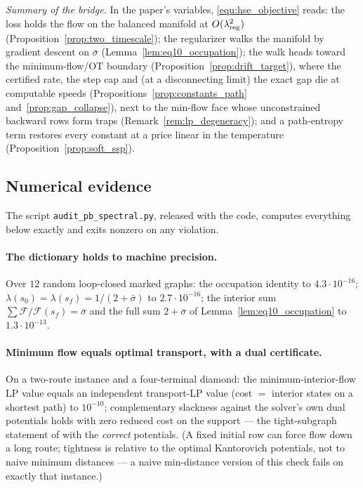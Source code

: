 \emph{Summary of the bridge.} In the paper's variables, \eqref{equ:hse_objective}
reads: the loss holds the flow on the balanced manifold at $O(\lambda_{\mathrm{reg}}^2)$
(Proposition~\ref{prop:two_timescale}); the regularizer walks the manifold by gradient
descent on $\bar\sigma$ (Lemma~\ref{lem:eq10_occupation}); the walk heads toward the
minimum-flow/OT boundary (Proposition~\ref{prop:drift_target}), where the certified
rate, the step cap and (at a disconnecting limit) the exact gap die at computable
speeds (Propositions~\ref{prop:constants_path} and~\ref{prop:gap_collapse}), next to
the min-flow face whose unconstrained backward rows form traps
(Remark~\ref{rem:lp_degeneracy}); and a path-entropy term restores every constant at a
price linear in the temperature (Proposition~\ref{prop:soft_ssp}).

\subsection{Numerical evidence}\label{sec:num_pb}

The script \texttt{audit\_pb\_spectral.py}, released with the code, computes everything
below exactly and exits nonzero on any violation.

\paragraph{The dictionary holds to machine precision.}
Over $12$ random loop-closed marked graphs: the occupation identity to
$4.3\cdot10^{-16}$; $\lambda(s_0)=\lambda(s_f)=1/(2+\bar\sigma)$ to $2.7\cdot10^{-16}$;
the interior sum $\sum\mathcal F/\mathcal F(s_f)=\bar\sigma$ and the full sum
$2+\bar\sigma$ of Lemma~\ref{lem:eq10_occupation} to $1.3\cdot10^{-13}$.

\paragraph{Minimum flow equals optimal transport, with a dual certificate.}
On a two-route instance and a four-terminal diamond: the minimum-interior-flow LP value
equals an independent transport-LP value (cost $=$ interior states on a shortest path)
to $10^{-10}$; complementary slackness against the solver's own dual potentials holds
with zero reduced cost on the support --- the tight-subgraph statement of
\citet[Thm~3.3]{maksimov2026ot} with the \emph{correct} potentials. (A fixed initial row
can force flow down a long route; tightness is relative to the optimal Kantorovich
potentials, not to naive minimum distances --- a naive min-distance version of this
check fails on exactly that instance.)

